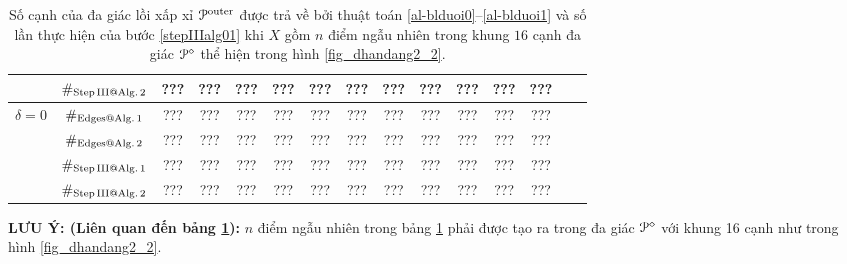 \documentclass[12pt,a4paper,openany,oneside]{report}
\begin{document}
\begin{table}[ht]
\begin{center}
\begin{tabular}{|c|c||c|c|c|c|c|c|c|c|c|c|c|c|c|}
			& $\#_{\rm Step\, III @ Alg.\, 2}$& ???& ???& ???& ???& ???& ???& ???& ???& ???& ???& ???   \\
			\hline
			{ $\delta = 0$}
			
			& $\#_{\rm Edges@ Alg.\, 1}$  &   ???& ???& ???& ???& ???& ???& ???& ???& ???& ???& ??? \\
			
			& $\#_{\rm Edges@ Alg.\, 2}$  &   ???& ???& ???& ???& ???& ???& ???& ???& ???& ???& ??? \\
			
			& $\#_{\rm Step\, III @ Alg.\, 1}$  &   ???& ???& ???& ???& ???& ???& ???& ???& ???& ???& ??? \\
			
			& $\#_{\rm Step\, III @ Alg.\, 2}$& ???& ???& ???& ???& ???& ???& ???& ???& ???& ???& ???   \\
			\hline
		\end{tabular}
		\caption{Số cạnh của đa giác lồi xấp xỉ ${\cal P}^{\rm outer}$ được trả về bởi thuật toán \ref{al-blduoi0}--\ref{al-blduoi1} và số lần thực hiện của bước \ref{stepIIIalg01} khi $X$ gồm $n$ điểm ngẫu nhiên trong khung $16$ cạnh đa giác ${\cal P}^\diamond$ thể hiện trong hình \ref{fig_dhandang2_2}.}
		\label{table01}
	\end{center}
\end{table} 	



	\bigskip\noindent
	{\bf LƯU Ý: (Liên quan đến bảng \ref{table01}):} 
	 $n$ điểm ngẫu nhiên trong bảng \ref{table01} phải được tạo ra trong đa giác ${\cal P}^\diamond$ với khung 16 cạnh như trong hình \ref{fig_dhandang2_2}.
	
	\bigskip
\end{document}

